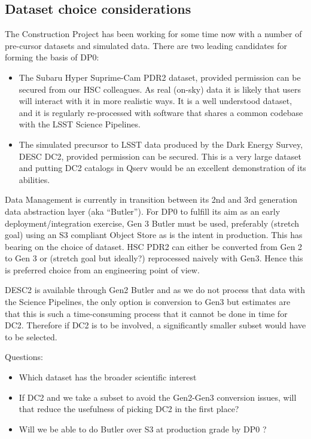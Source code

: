\subsection {Dataset choice considerations} \label{sec:dataset}

The Construction Project has been working for some time now with a number of pre-cursor datasets and simulated data. There are two leading candidates for forming the basis of DP0:

\begin{itemize}

\item The Subaru Hyper Suprime-Cam PDR2 dataset, provided permission can be secured from our HSC colleagues. As real (on-sky) data it is likely that users will interact with it in more realistic ways. It is a well understood dataset, and it is regularly re-processed with software that shares a common codebase with the LSST Science Pipelines.

\item The simulated precursor to LSST data produced by the Dark Energy Survey, DESC DC2, provided permission can be secured. This is a very large dataset and putting DC2 catalogs in Qserv would be an excellent demonstration of its abilities.

\end{itemize}

Data Management is currently in transition between its 2nd and 3rd generation data abstraction layer (aka ``Butler''). For DP0 to fulfill its aim as an early deployment/integration exercise, Gen 3 Butler must be used, preferably (stretch goal) using an S3 compliant Object Store as is the intent in production. This has bearing on the choice of dataset. HSC PDR2 can either be converted from Gen 2 to Gen 3 or (stretch goal but ideally?) reprocessed naively with Gen3. Hence this is preferred choice from an engineering point of view.

DESC2 is available through Gen2 Butler and as we do not process that data with the Science Pipelines, the only option is conversion to Gen3 but estimates are that this is such a time-consuming process that it cannot be done in time for DC2. Therefore if DC2 is to be involved, a significantly smaller subset would have to be selected.

Questions:

\begin{itemize}

\item Which dataset has the broader scientific interest

\item If DC2 and we take a subset to avoid the Gen2-Gen3 conversion issues, will that reduce the usefulness of picking DC2 in the first place?

\item Will we be able to do Butler over S3 at production grade by DP0 ?

\end{itemize}


